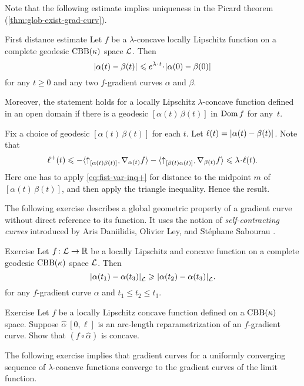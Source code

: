 Note that the following estimate implies uniqueness in the Picard theorem (\ref{thm:glob-exist-grad-curv}).

\begin{thm}{First distance estimate}\label{thm:dist-est}
Let $f$ be a $\lambda$-concave locally Lipschitz function on a complete geodesic $\mathrm{CBB}(\kappa)$ space $\mathcal{L}$.
Then
\[\dist{\alpha(t)}{\beta(t)}{}
\le 
e^{\lambda\cdot t}\cdot\dist[{{}}]{\alpha(0)}{\beta(0)}{}\]
for any $t\ge 0$ and any two $f$-gradient curves $\alpha$ and $\beta$.

Moreover, the statement holds for a locally Lipschitz $\lambda$-concave function defined in an open domain if there is a geodesic $[\alpha(t)\,\beta(t)]$ in $\mathop{\rm Dom}\nolimits f$ for any~$t$.
\end{thm}

Fix a choice of geodesic $[\alpha(t)\,\beta(t)]$ for each $t$.
Let $\ell(t)=\dist{\alpha(t)}{\beta(t)}{}$. 
Note that
\[\ell^+(t)
\le-
\<\dir{\alpha(t)}{\beta(t)},\nabla_{\alpha(t)}f\>-\<\dir{\beta(t)}{\alpha(t)},\nabla_{\beta(t)}f\>
\le
\lambda\cdot\ell(t).\]
Here one has to apply \ref{eq:fist-var-inq+} for distance to the midpoint $m$ of $[\alpha(t)\,\beta(t)]$, and then apply the triangle inequality.
Hence the result. 
\qeds



The following exercise describes a global geometric property of a gradient curve without direct reference to its function.
It uses the notion of \textit{self-contracting curves} introduced by Aris Daniilidis, Olivier Ley, and St\'ephane Sabourau \cite{daniilidis-ley-sabourau}.

\begin{thm}{Exercise}\label{ex:elf-contracting}
Let $f\colon\mathcal{L}\to\mathbb{R}$ be a locally Lipschitz and concave function on a complete geodesic $\mathrm{CBB}(\kappa)$ space
$\mathcal{L}$.
Then 
\[\dist{\alpha(t_1)}{\alpha(t_3)}{\spc{L}}\ge \dist{\alpha(t_2)}{\alpha(t_3)}{\spc{L}}.\]
for any $f$-gradient curve $\alpha$ and $t_1\le t_2\le t_3$.
\end{thm}

\begin{thm}{Exercise}\label{ex:mayer}
Let $f$ be a locally Lipschitz concave function defined on a $\mathrm{CBB}(\kappa)$ space.
Suppose $\hat\alpha\:[0,\ell]$ is an arc-length reparametrization of an $f$-gradient curve.
Show that $(f\circ\hat\alpha)$ is concave.
\end{thm}




The following exercise implies that gradient curves for a uniformly converging sequence of $\lambda$-concave functions converge to the gradient curves of the limit function.

